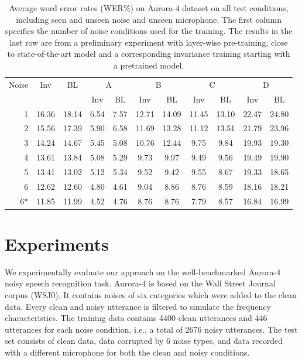 \documentclass[a4paper]{article}
\begin{document}
\begin{table}[t]
    \centering
    \caption{Average word error rates (WER\%) on Aurora-4 dataset on all test conditions,
        including seen and unseen noise and unseen microphone. The first column
        specifies the number of noise conditions used for the training. The
        results in the last row are from a preliminary experiment with
        layer-wise pre-training, close to state-of-the-art
        model and a corresponding invariance training starting with a pretrained model.}
    \label{tab:results}
    \begin{tabular}{r|cc||cc|cc|cc|cc}
        Noise       &Inv&BL&  \multicolumn{2}{c|}{A} & \multicolumn{2}{c|}{B} & \multicolumn{2}{c|}{C} & \multicolumn{2}{c}{D}\\
               & & &  Inv & BL & Inv & BL & Inv & BL & Inv & BL\\
    \hline
    1           &16.36        &18.14 &6.54&7.57    &12.71& 14.09   & 11.45&   13.10    & 22.47 &   24.80    \\
    2           &15.56        &17.39 &5.90&  6.58 &   11.69   &13.28   &11.12   &13.51   &21.79   &23.96 \\
    3           &14.24        &14.67 &5.45 & 5.08&    10.76&   12.44&   9.75&    9.84 &   19.93&   19.30\\
    4           &13.61        &13.84 & 5.08 &5.29    &9.73    &9.97    &9.49    &9.56    &19.49   &19.90\\         
    5           &13.41        &13.02 & 5.12 &5.34    &9.52    &9.42    &9.55    &8.67    &19.33   &18.65\\         
    6           &12.62        &12.60 & 4.80 &4.61    &9.04    &8.86    &8.76    &8.59    &18.16   &18.21\\
    \hline\hline
    6* &11.85        &11.99    &4.52    &4.76    &8.76    &8.76    &7.79    &8.57    &16.84&    16.99
    \end{tabular}
\end{table}

\section{Experiments}
\label{sec:experiments}
We experimentally evaluate our approach   
on the well-benchmarked Aurora-4 \citep{parihar2002aurora} noisy speech recognition task. Aurora-4
is based on the Wall Street Journal corpus (WSJ0). It contains noises of 
six categories which were added to the clean data. Every clean and noisy utterance is 
filtered to simulate the frequency characteristics. The training
data contains 4400 clean utterances and 446 utterances for each noise condition,
i.e., a total of 2676 noisy utterances.
The test set consists of clean data, data corrupted by 6 noise types, and data 
recorded with a different microphone for both the clean and noisy conditions.
\end{document}
